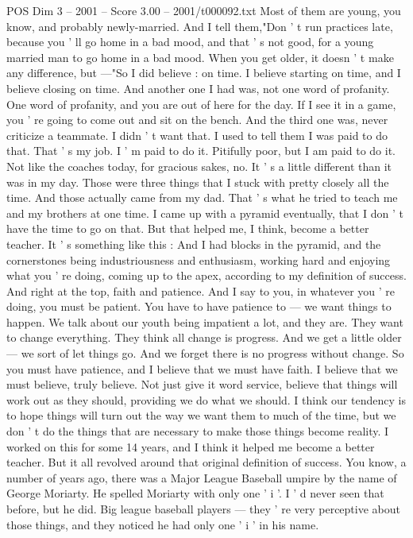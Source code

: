 \begin{textsample}{POS Dim 3 – 2001 – Score 3.00 – 2001/t000092.txt}
Most of them are young, you know, and probably newly-married.
And I tell them,"Don ' t run practices late, because you ' ll go home in a bad mood, and that ' s not good, for a young married man to go home in a bad mood.
When you get older, it doesn ' t make any difference, but —"So I did believe : on time.
I believe starting on time, and I believe closing on time.
And another one I had was, not one word of profanity.
One word of profanity, and you are out of here for the day.
If I see it in a game, you ' re going to come out and sit on the bench.
And the third one was, never criticize a teammate.
I didn ' t want that.
I used to tell them I was paid to do that.
That ' s my job.
I ' m paid to do it.
Pitifully poor, but I am paid to do it.
Not like the coaches today, for gracious sakes, no.
It ' s a little different than it was in my day.
Those were three things that I stuck with pretty closely all the time.
And those actually came from my dad.
That ' s what he tried to teach me and my brothers at one time.
I came up with a pyramid eventually, that I don ' t have the time to go on that.
But that helped me, I think, become a better teacher.
It ' s something like this : And I had blocks in the pyramid, and the cornerstones being industriousness and enthusiasm, working hard and enjoying what you ' re doing, coming up to the apex, according to my definition of success.
And right at the top, faith and patience.
And I say to you, in whatever you ' re doing, you must be patient.
You have to have patience to — we want things to happen.
We talk about our youth being impatient a lot, and they are.
They want to change everything.
They think all change is progress.
And we get a little older — we sort of let things go.
And we forget there is no progress without change.
So you must have patience, and I believe that we must have faith.
I believe that we must believe, truly believe.
Not just give it word service, believe that things will work out as they should, providing we do what we should.
I think our tendency is to hope things will turn out the way we want them to much of the time, but we don ' t do the things that are necessary to make those things become reality.
I worked on this for some 14 years, and I think it helped me become a better teacher.
But it all revolved around that original definition of success.
You know, a number of years ago, there was a Major League Baseball umpire by the name of George Moriarty.
He spelled Moriarty with only one ' i '.
I ' d never seen that before, but he did.
Big league baseball players — they ' re very perceptive about those things, and they noticed he had only one ' i ' in his name.

\end{textsample}
